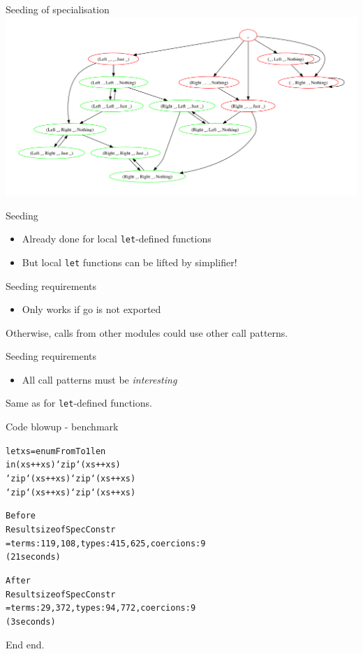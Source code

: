 \documentclass[t]{beamer}
\newcommand{\oomph}[1]{\textcolor[rgb]{0.0,0.5,0.9}{#1}}
\begin{document}
\begin{frame}{Seeding of specialisation}
\includegraphics[scale=0.33, trim=10mm 0mm 0mm 10mm, clip]{seeding.pdf}
\end{frame}

\begin{frame}[fragile]{Seeding}
\begin{itemize}
\item Already done for local \verb/let/-defined functions
\item But local \verb/let/ functions can be lifted by simplifier!
\end{itemize}
\end{frame}

\begin{frame}[fragile]{Seeding requirements}
\begin{itemize}
\item Only works if \oomph{go} is not exported
\end{itemize}
Otherwise, calls from other modules could use other call patterns.
\end{frame}

\begin{frame}[fragile]{Seeding requirements}
\begin{itemize}
\item All call patterns must be \emph{interesting}
\end{itemize}
Same as for \verb/let/-defined functions.
\end{frame}



\begin{frame}[fragile]{Code blowup - benchmark}
\begin{alltt}
let xs = enumFromTo 1 len
in       (xs ++ xs) `zip` (xs ++ xs)
   `zip` (xs ++ xs) `zip` (xs ++ xs)
   `zip` (xs ++ xs) `zip` (xs ++ xs)

\oomph{Before}
Result size of SpecConstr
  = {terms: 119,108, types: 415,625, coercions: 9}
(21 seconds)

\oomph{After}
Result size of SpecConstr
  = {terms: 29,372, types: 94,772, coercions: 9}
(3 seconds)
\end{alltt}
\end{frame}



\begin{frame}[fragile]{End}
end.
\end{frame}
\end{document}

